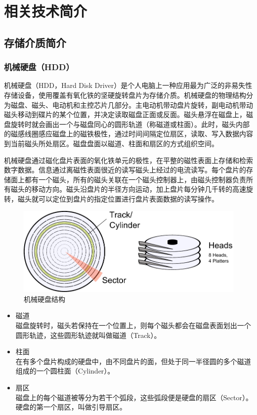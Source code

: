 
\chapter{相关技术简介}
\label{cha:related_work}

\section{存储介质简介}

\subsection{机械硬盘（HDD）}
机械硬盘\cite{hdd2009}（HDD，Hard Disk Driver）是个人电脑上一种应用最为广泛的非易失性存储设备，使用覆盖有氧化铁的坚硬旋转盘片为存储介质。机械硬盘的物理结构分为磁盘、磁头、电动机和主控芯片几部分。主电动机带动盘片旋转，副电动机带动磁头移动到碟片的某个位置，并决定读取磁盘正面或反面。磁头悬浮在磁盘上，磁盘旋转时就会画出一个与磁盘同心的圆形轨道（称磁道或柱面）。此时，磁头内部的磁感线圈感应磁盘上的磁铁极性，通过时间间隔定位扇区，读取、写入数据内容到当前磁头所处扇区。磁盘盘面以磁道、柱面和扇区的方式组织空间。

机械硬盘通过磁化盘片表面的氧化铁单元的极性，在平整的磁性表面上存储和检索数字数据。信息通过离磁性表面很近的读写磁头上经过的电流读写。每个盘片的存储面上都有一个磁头，所有的磁头关联在一个磁头控制器上，由磁头控制器负责所有磁头的移动方向。磁头沿盘片的半径方向运动，加上盘片每分钟几千转的高速旋转，磁头就可以定位到盘片的指定位置进行盘片表面数据的读写操作。

\begin{figure}[H]
\centering
\includegraphics[width=0.6\linewidth]{./graph/hdd-struct}
\caption{机械硬盘结构}
\label{fig:hdd-struct}
\end{figure}

\begin{itemize}
\item 磁道
\\磁盘旋转时，磁头若保持在一个位置上，则每个磁头都会在磁盘表面划出一个圆形轨迹，这些圆形轨迹就叫做磁道（Track）。
\item 柱面
\\在有多个盘片构成的硬盘中，由不同盘片的面，但处于同一半径圆的多个磁道组成的一个圆柱面（Cylinder）。
\item 扇区
\\磁盘上的每个磁道被等分为若干个弧段，这些弧段便是硬盘的扇区（Sector）。硬盘的第一个扇区，叫做引导扇区。
\end{itemize}

